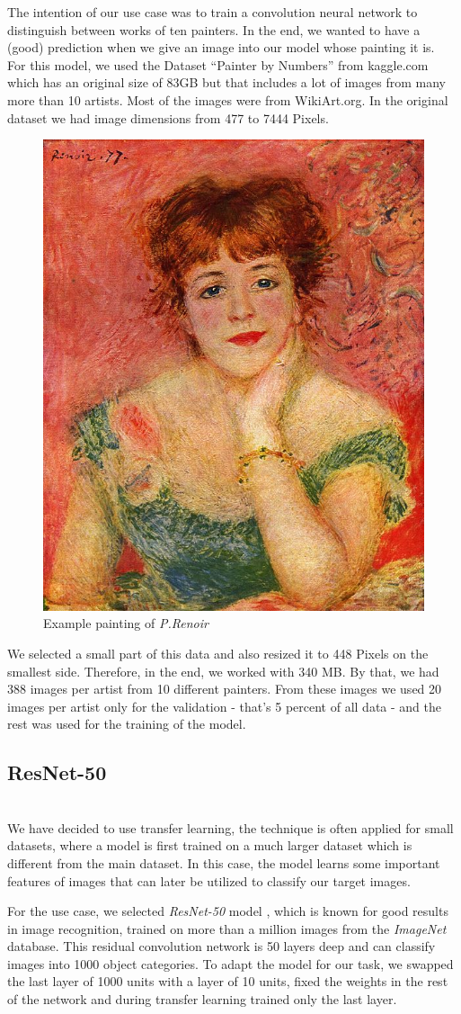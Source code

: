 \documentclass[
	12pt, %
]{fphw}
\begin{document}
The intention of our use case was to train a convolution neural network to distinguish between works of ten
painters. In the end, we wanted to have a (good) prediction when we give an image into our model whose painting it is.\\

For this model, we used the Dataset ``Painter by Numbers'' from kaggle.com \cite{kaggle} which has an original size of 83GB  but that includes a lot of images from many more than 10 artists. Most of the images were from WikiArt.org. In the original dataset we had image dimensions from 477 to 7444 Pixels.\\

\begin{figure}[H]
	\center\includegraphics[width=0.2 \textwidth]{Renoir.jpg}
	\caption{Example painting of \textit{P.Renoir}}
\end{figure}

We selected a small part of this data and also resized it to 448 Pixels on the smallest side. Therefore, in the end, we worked with 340 MB. By that, we had 388 images per artist from 10 different painters. From these images we used 20 images per artist only for the validation - that's 5 percent of all data - and the rest was used for the training of the model.\\

\subsection*{ResNet-50}
\ \\  

We have decided to use transfer learning, the technique is often applied for small datasets, where a model is first trained on a much larger dataset which is different from the main dataset. In this case, the model learns some important features of images that can later be utilized to classify our target images.  

For the use case, we selected \textit{ResNet-50} model \cite{resnet}, which is known for good results in image recognition, trained on more than a million images from the \textit{ImageNet} database. This residual convolution network is 50 layers deep and can classify images into 1000 object categories. To adapt the model for our task, we swapped the last layer of 1000 units with a layer of 10 units, fixed the weights in the rest of the network and during transfer learning trained only the last layer.  \\
\end{document}
